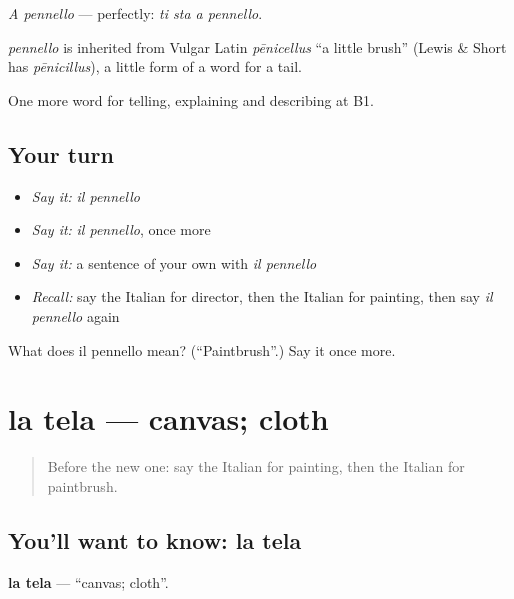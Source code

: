 \emph{A pennello} — perfectly: \emph{ti sta a pennello}.

\begin{cousinweb}
\emph{pennello} is inherited from Vulgar Latin \emph{pēnicellus} \textquotedblleft{}a little brush\textquotedblright{} (Lewis \& Short has \emph{pēnicillus}), a little form of a word for a tail.
\end{cousinweb}

\begin{grammarlens}[title={What you've built}]
One more word for telling, explaining and describing at B1.
\end{grammarlens}

\subsection*{Your turn}
\begin{itemize}
\raggedright
  \item \emph{Say it:} \emph{il pennello}
  \item \emph{Say it:} \emph{il pennello}, once more
  \item \emph{Say it:} a sentence of your own with \emph{il pennello}
  \item \emph{Recall:} say the Italian for director, then the Italian for painting, then say \emph{il pennello} again
\end{itemize}

\begin{tcolorbox}[breakable,colback=teal!4,colframe=teal!35!black,title={Before you move on}]
What does il pennello mean? (\textquotedblleft{}Paintbrush\textquotedblright{}.) Say it once more.
\end{tcolorbox}
\section[la tela]{la tela — canvas; cloth}

\label{lesson:IT-C521-tela}



\begin{quote}
Before the new one: say the Italian for painting, then the Italian for paintbrush.
\end{quote}

\subsection*{You'll want to know: la tela}
\textbf{la tela} — \textquotedblleft{}canvas; cloth\textquotedblright{}.

